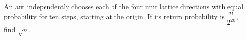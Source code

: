 An ant independently chooses each of the four unit lattice directions with equal probability for ten steps, starting at the origin. If its return probability is $\dfrac{n}{2^{20}}$, find $\sqrt n$.
